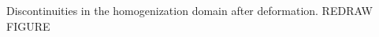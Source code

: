 \label{fig:homoboundary} Discontinuities in the homogenization domain after deformation. REDRAW FIGURE